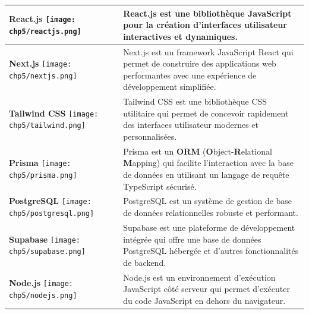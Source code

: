\begin{longtable}{|p{4cm}|p{11cm}|}
    \hline
    \centering \textbf{React.js} \vspace{0.2cm} \newline \centering \texttt{[image: chp5/reactjs.png]} & React.js est une bibliothèque JavaScript pour la création d'interfaces utilisateur interactives et dynamiques. \\
    \hline
    \centering \textbf{Next.js} \vspace{0.2cm} \newline \centering \texttt{[image: chp5/nextjs.png]} & Next.js est un framework JavaScript React qui permet de construire des applications web performantes avec une expérience de développement simplifiée. \\
    \hline
    \centering \textbf{Tailwind CSS} \vspace{0.2cm} \newline \centering \texttt{[image: chp5/tailwind.png]} & Tailwind CSS est une bibliothèque CSS utilitaire qui permet de concevoir rapidement des interfaces utilisateur modernes et personnalisées. \\
    \hline
    \centering \textbf{Prisma} \vspace{0.2cm} \newline \centering \texttt{[image: chp5/prisma.png]} & Prisma est un \textbf{ORM} (\textbf{O}bject-\textbf{R}elational \textbf{M}apping) qui facilite l'interaction avec la base de données en utilisant un langage de requête TypeScript sécurisé. \\
    \hline
    \centering \textbf{PostgreSQL} \vspace{0.2cm} \newline \centering \texttt{[image: chp5/postgresql.png]} & PostgreSQL est un système de gestion de base de données relationnelles robuste et performant. \\
    \hline
    \centering \textbf{Supabase} \vspace{0.2cm} \newline \centering \texttt{[image: chp5/supabase.png]} & Supabase est une plateforme de développement intégrée qui offre une base de données PostgreSQL hébergée et d'autres fonctionnalités de backend. \\
    \hline
    \centering \textbf{Node.js} \vspace{0.2cm} \newline \centering \texttt{[image: chp5/nodejs.png]} & Node.js est un environnement d'exécution JavaScript côté serveur qui permet d'exécuter du code JavaScript en dehors du navigateur. \\

\end{longtable}
